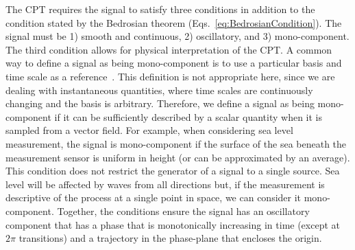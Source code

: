 \documentclass[journal,11pt,a4paper,onecolumn,draftcls]{IEEEtran}
\begin{document}
The CPT requires the signal to satisfy three conditions in addition to the condition stated by the Bedrosian theorem (Eqs.~\ref{eq:BedrosianCondition}). The signal must be 1) smooth and continuous, 2) oscillatory, and 3) mono-component. The third condition allows for physical interpretation of the CPT. A common way to define a signal as being mono-component is to use a particular basis and time scale as a reference~\cite{Boashash1992,Cohen1995}. This definition is not appropriate here, since we are dealing with instantaneous quantities, where time scales are continuously changing and the basis is arbitrary. Therefore, we define a signal as being mono-component if it can be sufficiently described by a scalar quantity when it is sampled from a vector field. For example, when considering sea level measurement, the signal is mono-component if the surface of the sea beneath the measurement sensor is uniform in height (or can be approximated by an average). This condition does not restrict the generator of a signal to a single source. Sea level will be affected by waves from all directions but, if the measurement is descriptive of the process at a single point in space, we can consider it mono-component. Together, the conditions ensure the signal has an oscillatory component that has a phase that is monotonically increasing in time (except at $2\pi$ transitions) and a trajectory in the phase-plane that encloses the origin. 
\end{document}
